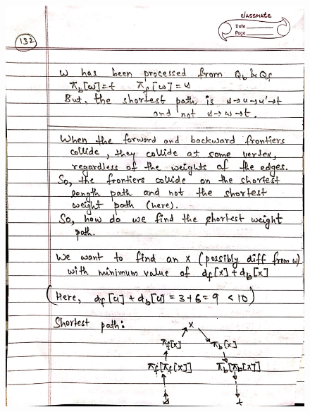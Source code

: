 \begin{figure}[H]
    \centering
    \includegraphics[width=16cm, height=21cm]{"./MIT-6.006/MIT-6006-132"}
\end{figure}
\newpage
